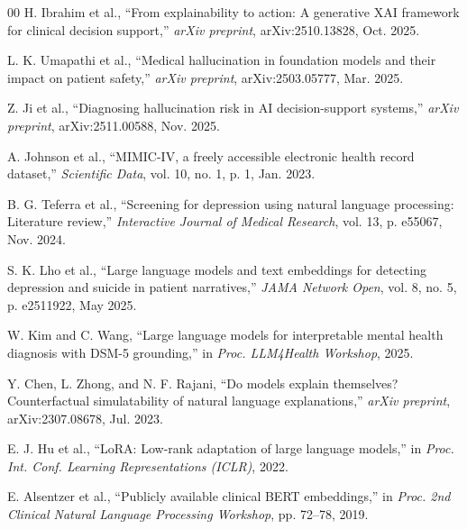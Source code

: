 \documentclass[conference]{IEEEtran}
\begin{document}
\begin{thebibliography}{00}
 H. Ibrahim et al., ``From explainability to action: A generative XAI framework for clinical decision support,'' \textit{arXiv preprint}, arXiv:2510.13828, Oct. 2025.

 L. K. Umapathi et al., ``Medical hallucination in foundation models and their impact on patient safety,'' \textit{arXiv preprint}, arXiv:2503.05777, Mar. 2025.

 Z. Ji et al., ``Diagnosing hallucination risk in AI decision-support systems,'' \textit{arXiv preprint}, arXiv:2511.00588, Nov. 2025.

 A. Johnson et al., ``MIMIC-IV, a freely accessible electronic health record dataset,'' \textit{Scientific Data}, vol. 10, no. 1, p. 1, Jan. 2023.

 B. G. Teferra et al., ``Screening for depression using natural language processing: Literature review,'' \textit{Interactive Journal of Medical Research}, vol. 13, p. e55067, Nov. 2024.

 S. K. Lho et al., ``Large language models and text embeddings for detecting depression and suicide in patient narratives,'' \textit{JAMA Network Open}, vol. 8, no. 5, p. e2511922, May 2025.

 W. Kim and C. Wang, ``Large language models for interpretable mental health diagnosis with DSM-5 grounding,'' in \textit{Proc. LLM4Health Workshop}, 2025.

 Y. Chen, L. Zhong, and N. F. Rajani, ``Do models explain themselves? Counterfactual simulatability of natural language explanations,'' \textit{arXiv preprint}, arXiv:2307.08678, Jul. 2023.

 E. J. Hu et al., ``LoRA: Low-rank adaptation of large language models,'' in \textit{Proc. Int. Conf. Learning Representations (ICLR)}, 2022.

 E. Alsentzer et al., ``Publicly available clinical BERT embeddings,'' in \textit{Proc. 2nd Clinical Natural Language Processing Workshop}, pp. 72--78, 2019.

\end{thebibliography}
\end{document}
